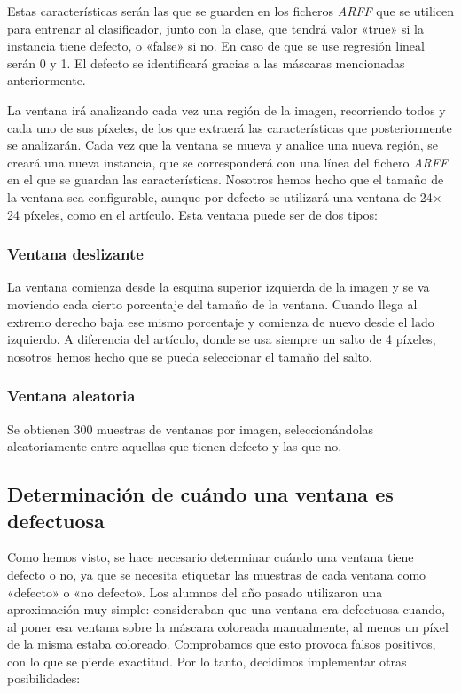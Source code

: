 Estas características serán las que se guarden en los ficheros \textit{ARFF} que se utilicen para entrenar
al clasificador, junto con la clase, que tendrá valor «true» si la instancia tiene defecto, o «false» si
no. En caso de que se use regresión lineal serán 0 y 1. El defecto se identificará gracias a las máscaras mencionadas anteriormente.

La ventana irá analizando cada vez una región de la imagen, recorriendo todos y cada uno de sus píxeles, de los que extraerá las características que posteriormente se analizarán. Cada vez que la ventana se mueva y analice una nueva región, se creará una nueva instancia, que se corresponderá con una línea del fichero \textit{ARFF} en el que se guardan las características. Nosotros hemos hecho que el tamaño de la ventana sea configurable, aunque por defecto se utilizará una ventana de 24$\times$24 píxeles, como en el artículo. Esta ventana puede ser de dos tipos:

\subsubsection*{Ventana deslizante}
La ventana comienza desde la esquina superior izquierda de la imagen y se va moviendo cada cierto porcentaje del tamaño de la ventana. Cuando llega al extremo derecho baja ese mismo porcentaje y comienza de nuevo desde el lado izquierdo. A diferencia del artículo, donde se usa siempre un salto de 4 píxeles, nosotros hemos hecho que se pueda seleccionar el tamaño del salto.


\subsubsection*{Ventana aleatoria}
Se obtienen 300 muestras de ventanas por imagen, seleccionándolas aleatoriamente entre aquellas que tienen defecto y las que no.

\subsection{Determinación de cuándo una ventana es defectuosa}
Como hemos visto, se hace necesario determinar cuándo una ventana tiene defecto o no, ya que se necesita etiquetar las muestras de cada ventana como «defecto» o «no defecto». Los alumnos del año pasado utilizaron una aproximación muy simple: consideraban que una ventana era defectuosa cuando, al poner esa ventana sobre la máscara coloreada manualmente, al menos un píxel de la misma estaba coloreado. Comprobamos que esto provoca falsos positivos, con lo que se pierde exactitud. Por lo tanto, decidimos implementar otras posibilidades:

